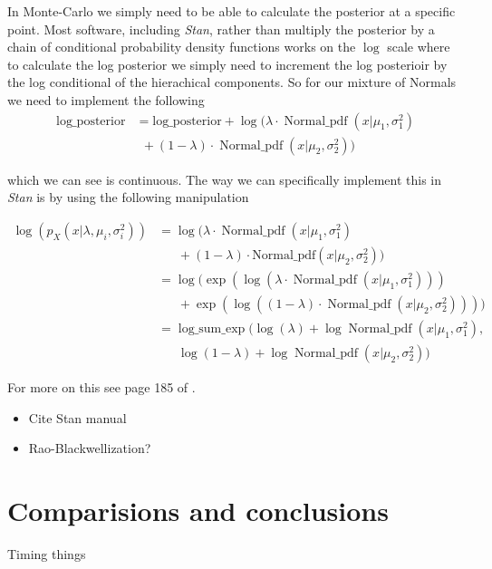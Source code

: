 \documentclass[11pt]{report}
\begin{document}
In Monte-Carlo we simply need to be able to calculate the posterior at a specific point. Most software, including \emph{Stan}, rather than multiply the posterior by a chain of conditional probability density functions works on the $\log$ scale where to calculate the log posterior we simply need to increment the log posterioir by the log conditional of the hierachical components. So for our mixture of Normals we need to implement the following
\begin{align}
  \text{log\_posterior} &= \text{log\_posterior} + \log(\lambda \cdot \operatorname{Normal\_pdf}(x | \mu_1, \sigma_1^2)  \nonumber \\
                   & \ \ + (1 - \lambda) \cdot \operatorname{Normal\_pdf}(x | \mu_2, \sigma_2^2))
\end{align}

which we can see is continuous. The way we can specifically implement this in \emph{Stan} is by using the following manipulation

\begin{align}
\log(p_X(x | \lambda, \mu_i, \sigma^2_i)) &= \log(\lambda \cdot \operatorname{Normal\_pdf}(x | \mu_1, \sigma_1^2)  \nonumber \\
& \ \ \ \ \ \ \ + (1 - \lambda) \cdot \text{Normal\_pdf}(x | \mu_2, \sigma_2^2)) \\
&= \log(\exp(\log(\lambda \cdot \operatorname{Normal\_pdf}(x | \mu_1, \sigma_1^2)))  \nonumber \\
& \ \ \ \ \ \ \ + \exp(\log((1 - \lambda) \cdot \operatorname{Normal\_pdf}(x | \mu_2, \sigma_2^2)))) \\
&= \operatorname{log\_sum\_exp}(\log(\lambda) + \log\operatorname{Normal\_pdf}(x | \mu_1, \sigma_1^2),  \nonumber \\
& \ \ \ \ \ \ \ \log(1 - \lambda) + \log\operatorname{Normal\_pdf}(x | \mu_2, \sigma_2^2))
\end{align} 

For more on this see page 185 of \cite{stan}.

\begin{itemize}

\item Cite Stan manual

\item Rao-Blackwellization? 

\end{itemize}

\chapter{Comparisions and conclusions}

Timing things

\printbibliography
\end{document}
